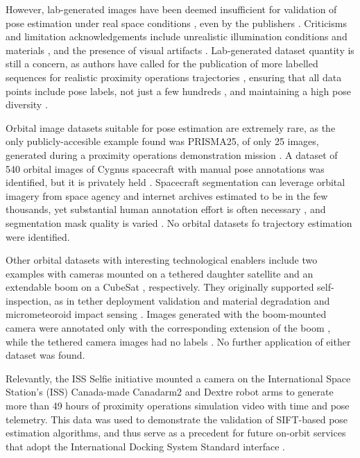 \documentclass[11pt]{article}
\begin{document}
However, lab-generated images have been deemed insufficient for validation of pose estimation under real space conditions \cite{pauly2023survey}, even by the publishers \cite{park2026flightready}.
Criticisms and limitation acknowledgements include unrealistic illumination conditions \cite{woffinden2017issselfie, park2022speedplus} and materials \cite{park2022speedplus, musallam2023cubesatcdt}, and the presence of visual artifacts \cite{park2022speedplus}.
Lab-generated dataset quantity is still a concern, as authors have called for the publication of more labelled sequences for realistic proximity operations trajectories \cite{black2021flightready}, ensuring that all data points include pose labels, not just a few hundreds \cite{park2022speedplus, musallam2023cubesatcdt, schubert2021pipeline}, and maintaining a high pose diversity \cite{musallam2023cubesatcdt}.

Orbital image datasets suitable for pose estimation are extremely rare, as the only publicly-accesible example found was PRISMA25, of only 25 images, generated during a proximity operations demonstration mission \cite{park2019robust}.
A dataset of 540 orbital images of Cygnus spacecraft with manual pose annotations was identified, but it is privately held \cite{musallam2023cubesatcdt}.
Spacecraft segmentation can leverage orbital imagery from space agency and internet archives estimated to be in the few thousands, yet substantial human annotation effort is often necessary \cite{park2022speedplus, sam2026spacecraftsegmentation}, and segmentation mask quality is varied \cite{sam2026spacecraftsegmentation}.
No orbital datasets fo trajectory estimation were identified.

Other orbital datasets with interesting technological enablers include two examples with cameras mounted on a tethered daughter satellite \cite{nohmi2009stars} and an extendable boom on a CubeSat \cite{taylor2025tpa1}, respectively.
They originally supported self-inspection, as in tether deployment validation \cite{nohmi2009stars} and material degradation and micrometeoroid impact sensing \cite{taylor2025tpa1}. Images generated with the boom-mounted camera were annotated only with the corresponding extension of the boom \cite{taylor2025tpa1}, while the tethered camera images had no labels \cite{nohmi2009stars}.
No further application of either dataset was found.

Relevantly, the ISS Selfie initiative mounted a camera on the International Space Station's (ISS) Canada-made Canadarm2 and Dextre robot arms \cite{woffinden2017issselfie} to generate more than 49 hours of proximity operations simulation video with time and pose telemetry.
This data was used to demonstrate the validation of SIFT-based pose estimation algorithms, and thus serve as a precedent for future on-orbit services that adopt the International Docking System Standard interface \cite{woffinden2017issselfie}.
\end{document}
